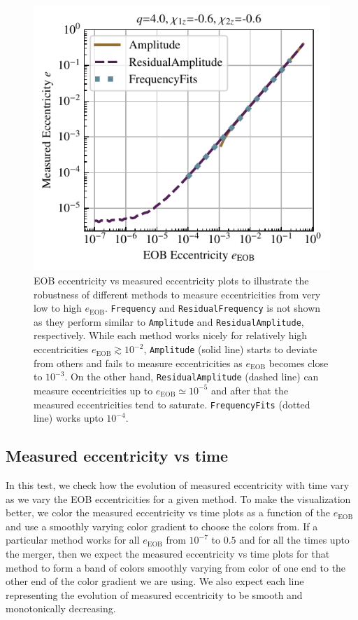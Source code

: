 \documentclass[aps,prd,amsmath,floats,floatfix, twocolumn,
superscriptaddress,nofootinbib,showpacs]{revtex4-1}
\newcommand{\eEOB}{e_{\text{EOB}}}
\newcommand{\mAmp}{\texttt{Amplitude}}
\newcommand{\mFreq}{\texttt{Frequency}}
\newcommand{\mResAmp}{\texttt{ResidualAmplitude}}
\newcommand{\mResFreq}{\texttt{ResidualFrequency}}
\newcommand{\mFreqFits}{\texttt{FrequencyFits}}
\begin{document}
\begin{figure}[thb]
\includegraphics[width=\columnwidth]{test_eob_vs_measured_ecc_example}
\caption{
  EOB eccentricity vs measured eccentricity plots to illustrate the
robustness of different methods to measure eccentricities from very
low to high $\eEOB$. \mFreq{} and \mResFreq{} is not shown as they
perform similar to \mAmp{} and \mResAmp{}, respectively.  While each
method works nicely for relatively high eccentricities $\eEOB \gtrsim
10^{-2}$, \mAmp{} (solid line) starts to deviate from others and fails
to measure eccentricities as $\eEOB$ becomes close to $10^{-3}$. On
the other hand, \mResAmp{} (dashed line) can measure eccentricities up
to $\eEOB \simeq 10^{-5}$ and after that the measured eccentricities
tend to saturate. \mFreqFits{} (dotted line) works upto $10^{-4}$.
}
\label{fig:eob_vs_measured_ecc}
\end{figure}

\subsection{Measured eccentricity vs time}
\label{sec:measured-eccentricity-vs-time}
In this test, we check how the evolution of measured eccentricity with
time vary as we vary the EOB eccentricities for a given method. To
make the visualization better, we color the measured eccentricity vs
time plots as a function of the $\eEOB$ and use a smoothly
varying color gradient to choose the colors from. If a particular
method works for all $\eEOB$ from $10^{-7}$ to $0.5$ and for
all the times upto the merger, then we expect the measured
eccentricity vs time plots for that method to form a band of colors
smoothly varying from color of one end to the other end of the color
gradient we are using. We also expect each line representing the
evolution of measured eccentricity to be smooth and monotonically
decreasing.
\end{document}
